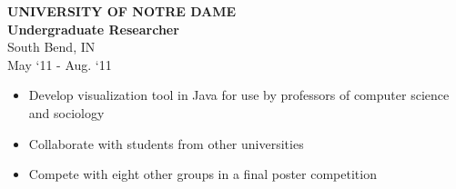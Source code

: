 \documentclass[a4paper,10pt]{article}
\newenvironment{details}
{\begin{itemize}[label=\Squarepipe,leftmargin=0.2in]}
{\end{itemize}}
\begin{document}
\begin{minipage}[t]{0.55\textwidth}
\textbf{UNIVERSITY OF NOTRE DAME\\Undergraduate Researcher}\\
South Bend, IN\\
May ‘11 - Aug. ‘11

\begin{details}
  \item Develop visualization tool in Java for use by professors of
computer science and sociology
  \item Collaborate with students from other universities
  \item Compete with eight other groups in a final poster competition
\end{details}

\end{minipage}
\hspace{0.1 in}
\end{document}
